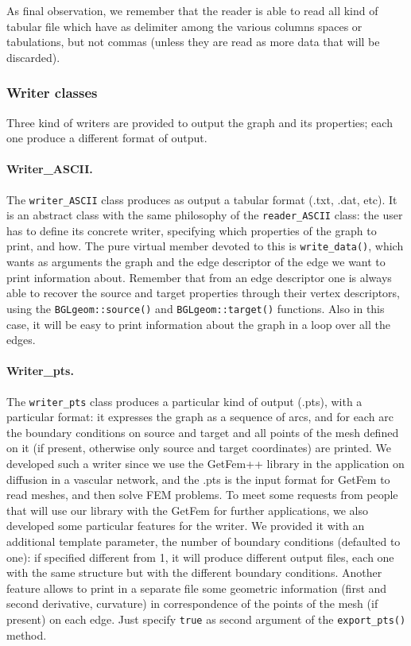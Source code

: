 \documentclass[10pt]{article} %
\begin{document}
	As final observation, we remember that the reader is able to read all kind of tabular file which have as delimiter among the various columns spaces or tabulations, but not commas (unless they are read as more data that will be discarded).
	
	\subsubsection{Writer classes}
	Three kind of writers are provided to output the graph and its properties; each one produce a different format of output.
	\paragraph{Writer\_ASCII.} The \texttt{writer\_ASCII} class produces as output a tabular format (.txt, .dat, etc). It is an abstract class with the same philosophy of the \texttt{reader\_ASCII} class: the user has to define its concrete writer, specifying which properties of the graph to print, and how. The pure virtual member devoted to this is \texttt{write\_data()}, which wants as arguments the graph and the edge descriptor of the edge we want to print information about. Remember that from an edge descriptor one is always able to recover the source and target properties through their vertex descriptors, using the \texttt{BGLgeom::source()} and \texttt{BGLgeom::target()} functions. Also in this case, it will be easy to print information about the graph in a loop over all the edges.
	\paragraph{Writer\_pts.} The \texttt{writer\_pts} class produces a particular kind of output (.pts), with a particular format: it expresses the graph as a sequence of arcs, and for each arc the boundary conditions on source and target and all points of the mesh defined on it (if present, otherwise only source and target coordinates) are printed. We developed such a writer since we use the GetFem++ library in the application on diffusion in a vascular network, and the .pts is the input format for GetFem to read meshes, and then solve FEM problems. \newline
	To meet some requests from people that will use our library with the GetFem for further applications, we also developed some particular features for the writer. We provided it with an additional template parameter, the number of boundary conditions (defaulted to one): if specified different from 1, it will produce different output files, each one with the same structure but with the different boundary conditions. Another feature allows to print in a separate file some geometric information (first and second derivative, curvature) in correspondence of the points of the mesh (if present) on each edge. Just specify \texttt{true} as second argument of the \texttt{export\_pts()} method.
\end{document}
